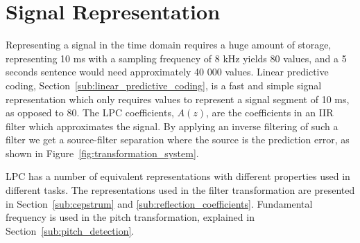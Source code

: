 
\section{Signal Representation} %
\label{the:signal_representation}
Representing a signal in the time domain requires a huge amount of storage, \eg representing 10 ms with a sampling frequency of 8 kHz yields 80 values, and a 5 seconds sentence would need approximately 40 000 values. Linear predictive coding, Section~\ref{sub:linear_predictive_coding}, is a fast and simple signal representation which only requires  values to represent a signal segment of 10 ms, as opposed to 80. The LPC coefficients, $A(z)$, are the coefficients in an IIR filter which approximates the signal. By applying an inverse filtering of such a filter we get a source-filter separation where the source is the prediction error, as shown in Figure~\ref{fig:transformation_system}.

LPC has a number of equivalent representations with different properties used in different tasks. The representations used in the filter transformation are presented in Section~\ref{sub:cepstrum} and \ref{sub:reflection_coefficients}. Fundamental frequency is used in the pitch transformation, explained in Section~\ref{sub:pitch_detection}.


